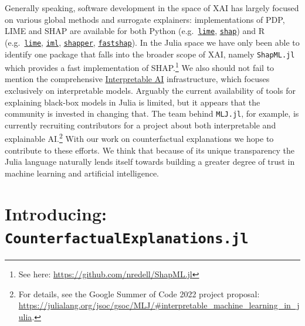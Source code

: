 \documentclass[
  letterpaper,
  DIV=11,
  numbers=noendperiod]{scrartcl}
\begin{document}
Generally speaking, software development in the space of XAI has largely
focused on various global methods and surrogate explainers:
implementations of PDP, LIME and SHAP are available for both Python
(e.g.~\href{https://github.com/marcotcr/lime}{\texttt{lime}},
\href{https://github.com/slundberg/shap}{\texttt{shap}}) and R
(e.g.~\href{https://cran.r-project.org/web/packages/lime/index.html}{\texttt{lime}},
\href{https://cran.r-project.org/web/packages/lime/index.html}{\texttt{iml}},
\href{https://modeloriented.github.io/shapper/}{\texttt{shapper}},
\href{https://github.com/bgreenwell/fastshap}{\texttt{fastshap}}). In
the Julia space we have only been able to identify one package that
falls into the broader scope of XAI, namely \texttt{ShapML.jl} which
provides a fast implementation of SHAP.\footnote{See here:
  \url{https://github.com/nredell/ShapML.jl}} We also should not fail to
mention the comprehensive
\href{https://docs.interpretable.ai/stable/IAIBase/data/}{Interpretable
AI} infrastructure, which focuses exclusively on interpretable models.
Arguably the current availability of tools for explaining black-box
models in Julia is limited, but it appears that the community is
invested in changing that. The team behind \texttt{MLJ.jl}, for example,
is currently recruiting contributors for a project about both
interpretable and explainable AI.\footnote{For details, see the Google
  Summer of Code 2022 project proposal:
  \url{https://julialang.org/jsoc/gsoc/MLJ/\#interpretable_machine_learning_in_julia}.}
With our work on counterfactual explanations we hope to contribute to
these efforts. We think that because of its unique transparency the
Julia language naturally lends itself towards building a greater degree
of trust in machine learning and artificial intelligence.

\hypertarget{sec-arch}{%
\section{\texorpdfstring{Introducing:
\texttt{CounterfactualExplanations.jl}}{Introducing: CounterfactualExplanations.jl}}\label{sec-arch}}
\end{document}
